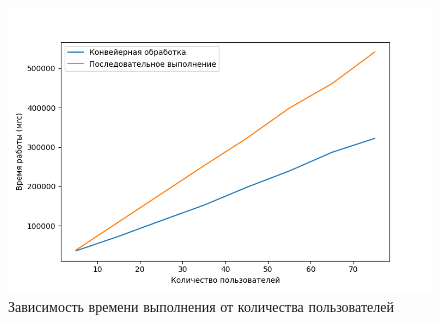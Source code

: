 \documentclass[a4paper,oneside,14pt]{extreport}
\begin{document}
\begin{figure}[H]
	\centering
	\includegraphics[width=0.9\linewidth]{images/con_vs_serial}
	\caption{Зависимость времени выполнения от количества пользователей}
	\label{fig:graph}
\end{figure}
\end{document}
